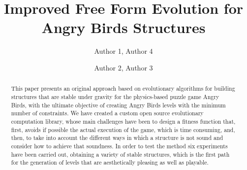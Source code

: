 \documentclass[sigconf]{acmart}
\begin{document}
\title{Improved Free Form Evolution for Angry Birds Structures}

\author{Author 1, Author 4}

\author{Author 2, Author 3}

\renewcommand{\shortauthors}{Author 1 et al.}


\begin{abstract}
This paper presents an original approach based on evolutionary algorithms for 
building structures that
are stable under gravity for the physics-based puzzle game Angry
Birds, with the ultimate objective of creating
Angry Birds levels with the minimum number of constraints.
We have created a custom open source evolutionary computation library,
whose main challenges have been to design a fitness function that, first, 
avoids if
possible the actual execution of the game, which is time
consuming, and, then, to take into account the different ways in which
a structure is not sound and consider how to achieve that soundness.
In order to test the method six experiments have been carried out,
obtaining a variety of stable structures, which is the first path for
the generation of levels that are aesthetically pleasing as well as
playable. 
\end{abstract}

%
%
\end{document}
